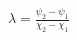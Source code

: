 \documentclass[amsart]{article}
\begin{document}
$\lambda=\frac{\psi_2-\psi_1}{\chi_2-\chi_1}$
\end{document}
